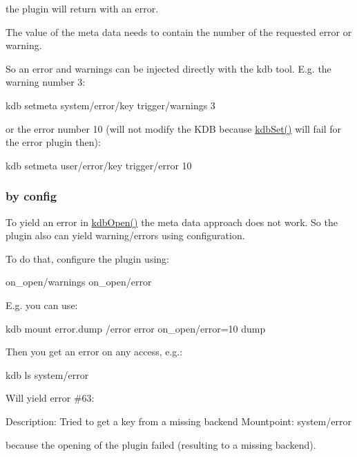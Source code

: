 the plugin will return with an error.

The value of the meta data needs to contain the number of the requested error or warning.

So an error and warnings can be injected directly with the kdb tool. E.\+g. the warning number 3\+: \begin{DoxyVerb}    kdb setmeta system/error/key trigger/warnings 3
\end{DoxyVerb}


or the error number 10 (will not modify the K\+D\+B because \hyperlink{group__kdb_ga11436b058408f83d303ca5e996832bcf}{kdb\+Set()} will fail for the error plugin then)\+: \begin{DoxyVerb}    kdb setmeta user/error/key trigger/error 10
\end{DoxyVerb}


\subsubsection*{by config}

To yield an error in \hyperlink{group__kdb_ga6808defe5870f328dd17910aacbdc6ca}{kdb\+Open()} the meta data approach does not work. So the plugin also can yield warning/errors using configuration.

To do that, configure the plugin using\+: \begin{DoxyVerb}    on_open/warnings
    on_open/error
\end{DoxyVerb}


E.\+g. you can use\+: \begin{DoxyVerb}    kdb mount error.dump /error error on_open/error=10 dump
\end{DoxyVerb}


Then you get an error on any access, e.\+g.\+: \begin{DoxyVerb}    kdb ls system/error
\end{DoxyVerb}


Will yield error \#63\+: \begin{DoxyVerb}    Description: Tried to get a key from a missing backend
    Mountpoint: system/error
\end{DoxyVerb}


because the opening of the plugin failed (resulting to a missing backend). 